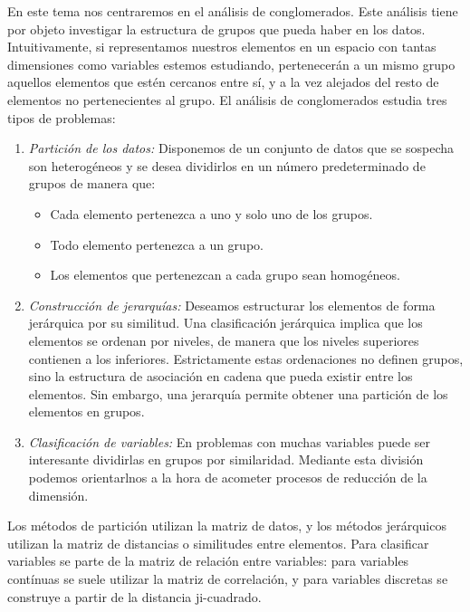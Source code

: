 En este tema nos centraremos en el an\'alisis de conglomerados. Este an\'alisis tiene por objeto investigar la estructura de grupos que pueda haber en los datos. Intuitivamente, si representamos nuestros elementos en un espacio con tantas dimensiones como variables estemos estudiando, pertenecer\'an a un mismo grupo aquellos elementos que est\'en cercanos entre s\'i, y a la vez alejados del resto de elementos no pertenecientes al grupo. El an\'alisis de conglomerados estudia tres tipos de problemas:
\begin{enumerate}
\item \textit{Partici\'on de los datos:} Disponemos de un conjunto de datos que se sospecha son heterog\'eneos y se desea dividirlos en un n\'umero predeterminado de grupos de manera que:
\begin{itemize}
\item Cada elemento pertenezca a uno y solo uno de los grupos.
\item Todo elemento pertenezca a un grupo.
\item Los elementos que pertenezcan a cada grupo sean homog\'eneos.
\end{itemize}
\item \textit{Construcci\'on de jerarqu\'ias:} Deseamos estructurar los elementos de forma jer\'arquica por su similitud. Una clasificaci\'on jer\'arquica implica que los elementos se ordenan por niveles, de manera que los niveles superiores contienen a los inferiores. Estrictamente estas ordenaciones no definen grupos, sino la estructura de asociaci\'on en cadena que pueda existir entre los elementos. Sin embargo, una jerarqu\'ia permite obtener una partici\'on de los elementos en grupos.
\item \textit{Clasificaci\'on de variables:} En problemas con muchas variables puede ser interesante dividirlas en grupos por similaridad. Mediante esta divisi\'on podemos orientarlnos a la hora de acometer procesos de reducci\'on de la dimensi\'on.
\end{enumerate}

Los m\'etodos de partici\'on utilizan la matriz de datos, y los m\'etodos jer\'arquicos utilizan la matriz de distancias o similitudes entre elementos. Para clasificar variables se parte de la matriz de relaci\'on entre variables: para variables cont\'inuas se suele utilizar la matriz de correlaci\'on, y para variables discretas se construye a partir de la distancia ji-cuadrado.





